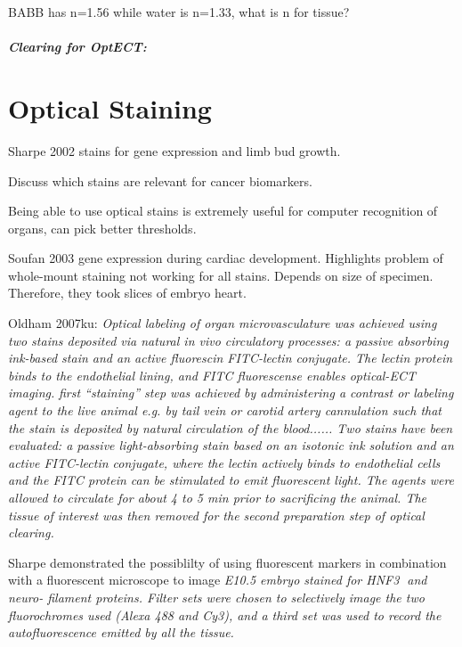 \documentclass[12pt]{article}
\begin{document}
BABB has n=1.56 while water is n=1.33, what is n for tissue? \cite{Walls:2005ja}


\subparagraph{Clearing for OptECT:}
\cite{Oldham:2008dfa}
\cite{Sakhalkar:2007hp} 





\newpage
\section{Optical Staining}
Sharpe 2002 stains for gene expression and limb bud growth. 

Discuss which stains are relevant for cancer biomarkers. \cite{Hanahan:2011gua}

Being able to use optical stains is extremely useful for computer recognition of organs, can pick better thresholds. \cite{Sharpe:2003cm}

Soufan 2003 \cite{Soufan:2003cd} gene expression during cardiac development. 
Highlights problem of whole-mount staining not working for all stains. Depends on size of specimen. Therefore, they took slices of embryo heart.

Oldham 2007ku: \textit{Optical labeling of organ microvasculature was achieved using two stains deposited via natural in vivo circulatory processes: a passive absorbing ink-based stain and an active fluorescin FITC-lectin conjugate. The lectin protein binds to the endothelial lining, and FITC fluorescense enables optical-ECT imaging.}
\textit{first “staining” step was achieved by administering a contrast or labeling agent to the live animal e.g. by tail vein or carotid artery cannulation such that the stain is deposited by natural   circulation of the blood...... Two   stains   have   been   evaluated:   a   passive   light-absorbing stain based on an isotonic ink solution and an active FITC-lectin conjugate, where the lectin actively binds to endothelial cells and the FITC protein can be stimulated to emit fluorescent   light.   The   agents   were   allowed   to   circulate   for about 4 to 5 min prior to sacrificing the animal. The tissue of interest was then removed for the second preparation step of optical clearing.
}


Sharpe demonstrated the possiblilty of using fluorescent markers in combination with a fluorescent microscope to image \textit{E10.5 embryo stained for HNF3 and neuro- filament   proteins.   Filter   sets   were   chosen   to selectively image the two fluorochromes used (Alexa 488 and Cy3), and a third set was used to record the autofluorescence emitted by all the
 tissue.}
\end{document}
